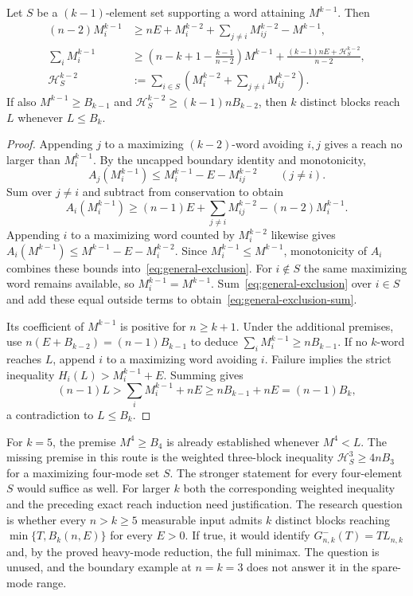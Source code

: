 \begin{lemma}\label{lem:general-exclusion}
Let $S$ be a $(k-1)$-element set supporting a word attaining $M^{k-1}$.
Then
\begin{align}
 (n-2)M_i^{k-1}
 &\ge nE+M_i^{k-2}+\sum_{j\ne i}M_{ij}^{k-2}-M^{k-1},
       \label{eq:general-exclusion}\\
 \sum_iM_i^{k-1}
 &\ge\left(n-k+1-\frac{k-1}{n-2}\right)M^{k-1}
       +\frac{(k-1)nE+\mathcal H_S^{k-2}}{n-2},
       \label{eq:general-exclusion-sum}\\
 \mathcal H_S^{k-2}
 &:=\sum_{i\in S}\left(M_i^{k-2}+\sum_{j\ne i}M_{ij}^{k-2}\right).
       \label{eq:general-weighted-H}
\end{align}
If also $M^{k-1}\ge B_{k-1}$ and
$\mathcal H_S^{k-2}\ge(k-1)nB_{k-2}$, then $k$ distinct blocks reach
$L$ whenever $L\le B_k$.
\end{lemma}
\begin{proof}
Appending $j$ to a maximizing $(k-2)$-word avoiding $i,j$ gives a
reach no larger than $M_i^{k-1}$. By the uncapped boundary identity
and monotonicity,
\[
 A_j(M_i^{k-1})\le M_i^{k-1}-E-M_{ij}^{k-2}\qquad(j\ne i).
\]
Sum over $j\ne i$ and subtract from conservation to obtain
\[
 A_i(M_i^{k-1})\ge(n-1)E+\sum_{j\ne i}M_{ij}^{k-2}
                              -(n-2)M_i^{k-1}.
\]
Appending $i$ to a maximizing word counted by $M_i^{k-2}$ likewise
gives $A_i(M^{k-1})\le M^{k-1}-E-M_i^{k-2}$.
Since $M_i^{k-1}\le M^{k-1}$, monotonicity of $A_i$ combines these
bounds into~\eqref{eq:general-exclusion}. For $i\notin S$ the same
maximizing word remains available, so $M_i^{k-1}=M^{k-1}$.
Sum~\eqref{eq:general-exclusion} over $i\in S$ and add these equal
outside terms to obtain~\eqref{eq:general-exclusion-sum}.

Its coefficient of $M^{k-1}$ is positive for $n\ge k+1$.
Under the additional premises, use
$n(E+B_{k-2})=(n-1)B_{k-1}$ to deduce
$\sum_iM_i^{k-1}\ge nB_{k-1}$. If no $k$-word reaches $L$, append
$i$ to a maximizing word avoiding $i$. Failure implies the strict
inequality $H_i(L)>M_i^{k-1}+E$. Summing gives
\[
 (n-1)L>\sum_iM_i^{k-1}+nE
             \ge nB_{k-1}+nE=(n-1)B_k,
\]
a contradiction to $L\le B_k$.
\end{proof}

For $k=5$, the premise $M^4\ge B_4$ is already established whenever
$M^4<L$. The missing premise in this route is the weighted three-block
inequality $\mathcal H_S^3\ge4nB_3$ for a maximizing four-mode set
$S$. The stronger statement for every four-element $S$ would suffice
as well. For larger $k$ both the corresponding weighted inequality and
the preceding exact reach induction need justification.
The research question is whether every $n>k\ge5$ measurable input admits
$k$ distinct blocks reaching $\min\{T,B_k(n,E)\}$ for every $E>0$.
If true, it would identify $G^-_{n,k}(T)=TL_{n,k}$ and, by the proved
heavy-mode reduction, the full minimax. The question is unused, and the
boundary example at $n=k=3$ does not answer it in the spare-mode range.

